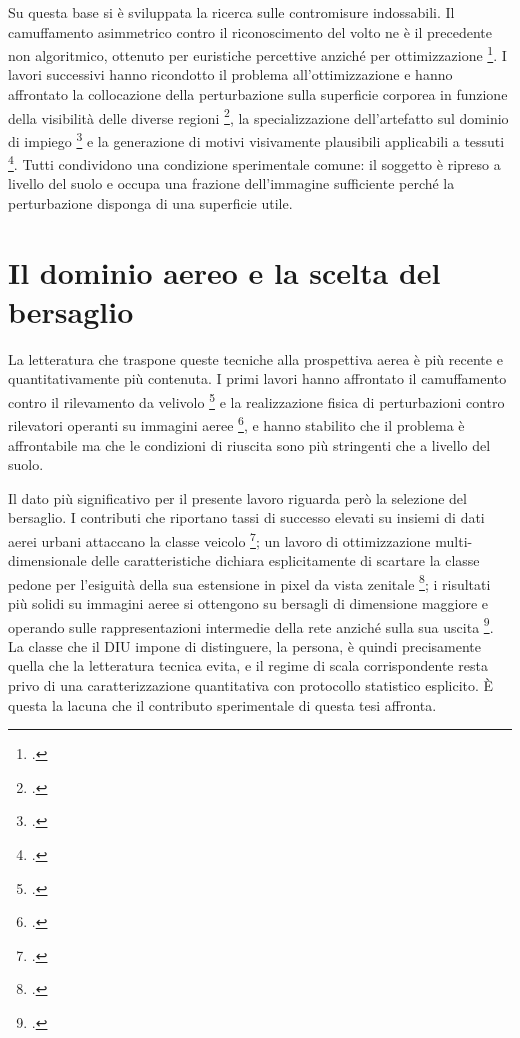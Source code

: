 \ifstampa\documentclass[a4paper,12pt,twoside,openright]{report}\else\documentclass[a4paper,12pt]{report}\fi
\newif\ifrevisione \revisionefalse
\DeclareRobustCommand{\rev}[1]{\ifrevisione{\color{blue!65!black}#1}\else#1\fi}
\begin{document}
Su questa base si è sviluppata la ricerca sulle contromisure indossabili. Il
camuffamento asimmetrico contro il riconoscimento del volto ne è il precedente
non algoritmico, ottenuto per euristiche percettive anziché per ottimizzazione
\footcite{harvey_2010}. I lavori successivi hanno ricondotto il problema
all'ottimizzazione e hanno affrontato la collocazione della perturbazione sulla
superficie corporea in funzione della visibilità delle diverse regioni
\footcite{huang_2020_upc}, la specializzazione dell'artefatto sul dominio di
impiego \footcite{wu_2020} e la generazione di motivi visivamente plausibili
applicabili a tessuti \footcite{hu_2022}. Tutti condividono una condizione
sperimentale comune: il soggetto è ripreso a livello del suolo e occupa una
frazione dell'immagine sufficiente perché la perturbazione disponga di una
superficie utile.

\section{Il dominio aereo e la scelta del bersaglio}
\label{sec:sota_aereo}

La letteratura che traspone queste tecniche alla prospettiva aerea è più recente
e quantitativamente più contenuta. I primi lavori hanno affrontato il
camuffamento contro il rilevamento da velivolo \footcite{adhikari_2020} e la
realizzazione fisica di perturbazioni contro rilevatori operanti su immagini
aeree \footcite{du_2022}, e hanno stabilito che il problema è affrontabile ma che
le condizioni di riuscita sono più stringenti che a livello del suolo.

Il dato più significativo per il presente lavoro riguarda però la selezione del
bersaglio. I contributi che riportano tassi di successo elevati su insiemi di
dati aerei urbani attaccano la classe veicolo \footcite{shrestha_2023}; un lavoro
di ottimizzazione multi-dimensionale delle caratteristiche dichiara
esplicitamente di scartare la classe pedone per l'esiguità della sua estensione
in pixel da vista zenitale \footcite{xi_2025_lfrap}; i risultati più solidi su
immagini aeree si ottengono su bersagli di dimensione maggiore e operando sulle
rappresentazioni intermedie della rete anziché sulla sua uscita
\footcite{tang_2023}. La classe che il \rev{DIU} impone
di distinguere, la persona, è quindi precisamente quella che la letteratura
tecnica evita, e il regime di scala corrispondente resta privo di una
caratterizzazione quantitativa con protocollo statistico esplicito. È questa la
lacuna che il contributo sperimentale di questa tesi affronta.
\end{document}

